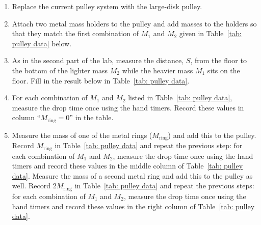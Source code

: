 \documentclass[addpoints]{physlabs}
\begin{document}
\begin{labsection}
\begin{experiment}
\begin{enumerate}
    \item Replace the current pulley system with the large-disk pulley.
    \item Attach two metal mass holders to the pulley and add masses to the holders so that they match the first combination of $M_1$ and $M_2$ given in Table~\ref{tab: pulley data} below.
    \item As in the second part of the lab, measure the distance, $S$, from the floor to the bottom of the lighter mass $M_2$ while the heavier mass $M_1$ sits on the floor. Fill in the result below in Table~\ref{tab: pulley data}.
    \item For each combination of $M_1$ and $M_2$ listed in Table~\ref{tab: pulley data}, measure the drop time once using the hand timers. Record these values in column ``$M_\text{ring}=0$'' in the table.
    \item Measure the mass of one of the metal rings ($M_\text{ring}$) and add this to the pulley. Record $M_\text{ring}$ in Table~\ref{tab: pulley data} and repeat the previous step: for each combination of $M_1$ and $M_2$, measure the drop time once using the hand timers and record these values in the middle column of Table~\ref{tab: pulley data}.
    Measure the mass of a second metal ring and add this to the pulley as well. Record $2M_\text{ring}$ in Table~\ref{tab: pulley data} and repeat the previous steps: for each combination of $M_1$ and $M_2$, measure the drop time once using the hand timers and record these values in the right column of Table~\ref{tab: pulley data}.
\end{enumerate}


\end{experiment}
\end{labsection}
\end{document}
